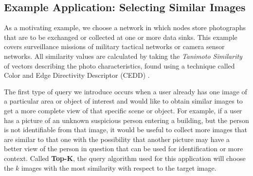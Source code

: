 \subsection{Example Application: Selecting Similar Images}

As a motivating example, we choose a network in which nodes store photographs that are to be exchanged or collected at one or more data sinks.  This example covers surveillance missions of military tactical networks or camera sensor networks.  
All similarity values are calculated by taking the \emph{Tanimoto Similarity} \cite{tanimoto} of vectors describing the photo characteristics, found using a technique called Color and Edge Directivity Descriptor (CEDD) \cite{2008cedd}.



The first type of query we introduce occurs when a user already has one image of a particular area or object of interest and would like to obtain similar images to get a more complete view of that specific scene or object.  For example, if a user has a picture of an unknown suspicious person entering a building, but the person is not identifiable from that image, it would be useful to collect more images that are similar to that one with the possibility that another picture may have a better view of the person in question that can be used for identification or more context.  Called {\bf Top-K}, the query algorithm used for this application will choose the $k$ images with the most similarity with respect to the target image.  

